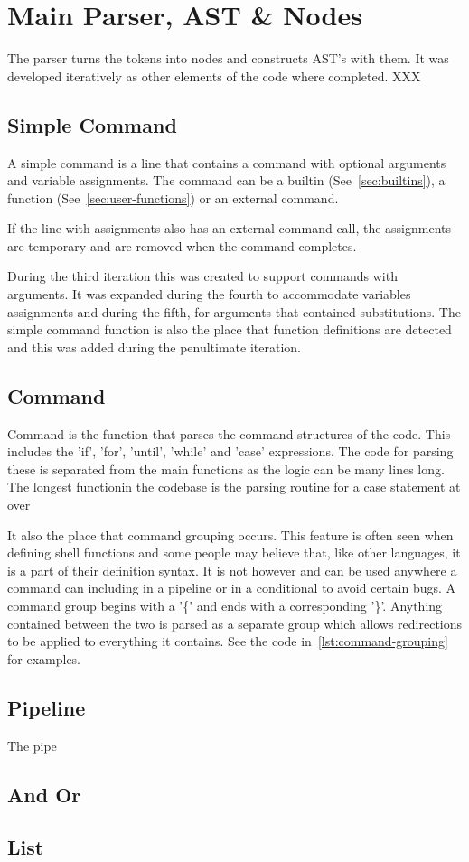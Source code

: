 \section{Main Parser, AST \& Nodes}
The parser turns the tokens into nodes and constructs AST's with them.
It was developed iteratively as other elements of the code where completed. XXX

\subsection{Simple Command}
A simple command is a line that contains a command with optional arguments and variable assignments.
The command can be a builtin (See~\ref{sec:builtins}), a function (See~\ref{sec:user-functions}) or an external command.

If the line with assignments also has an external command call, the assignments are temporary and are removed when the command completes.

During the third iteration this was created to support commands with arguments.
It was expanded during the fourth to accommodate variables assignments and during the fifth, for arguments that contained substitutions.
The simple command function is also the place that function definitions are detected and this was added during the penultimate iteration.

\subsection{Command}
Command is the function that parses the command structures of the code.
This includes the 'if', 'for', 'until', 'while' and 'case' expressions.
The code for parsing these is separated from the main functions as the logic can be many lines long.
The longest functionin the codebase is the parsing routine for a case statement at over 

It also the place that command grouping occurs.
This feature is often seen when defining shell functions and some people may believe that, like other languages, it is a part of their definition syntax.
It is not however and can be used anywhere a command can including in a pipeline or in a conditional to avoid certain bugs.
A command group begins with a '\{' and ends with a corresponding '\}'.
Anything contained between the two is parsed as a separate group which allows redirections to be applied to everything it contains.
See the code in~\ref{lst:command-grouping} for examples.

\subsection{Pipeline}
The pipe
\subsection{And Or}
\subsection{List}

